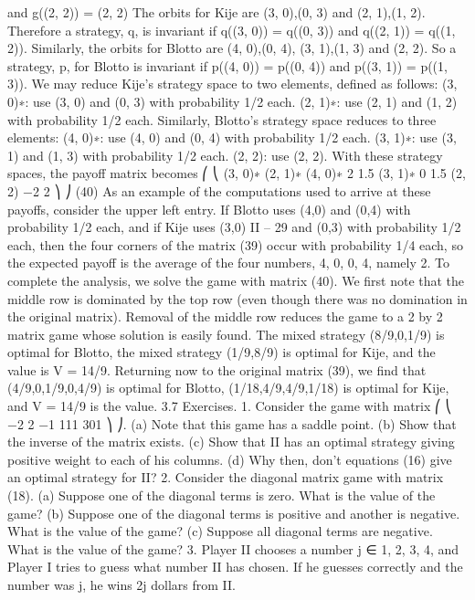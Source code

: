 and g((2, 2)) = (2, 2)
The orbits for Kije are {(3, 0),(0, 3)} and {(2, 1),(1, 2)}. Therefore a strategy, q, is
invariant if q((3, 0)) = q((0, 3)) and q((2, 1)) = q((1, 2)). Similarly, the orbits for Blotto
are {(4, 0),(0, 4)}, {(3, 1),(1, 3)} and {(2, 2)}. So a strategy, p, for Blotto is invariant if
p((4, 0)) = p((0, 4)) and p((3, 1)) = p((1, 3)).
We may reduce Kije’s strategy space to two elements, defined as follows:
(3, 0)∗: use (3, 0) and (0, 3) with probability 1/2 each.
(2, 1)∗: use (2, 1) and (1, 2) with probability 1/2 each.
Similarly, Blotto’s strategy space reduces to three elements:
(4, 0)∗: use (4, 0) and (0, 4) with probability 1/2 each.
(3, 1)∗: use (3, 1) and (1, 3) with probability 1/2 each.
(2, 2): use (2, 2).
With these strategy spaces, the payoff matrix becomes
⎛
⎝
(3, 0)∗ (2, 1)∗
(4, 0)∗ 2 1.5
(3, 1)∗ 0 1.5
(2, 2) −2 2
⎞
⎠ (40)
As an example of the computations used to arrive at these payoffs, consider the upper
left entry. If Blotto uses (4,0) and (0,4) with probability 1/2 each, and if Kije uses (3,0)
II – 29
and (0,3) with probability 1/2 each, then the four corners of the matrix (39) occur with
probability 1/4 each, so the expected payoff is the average of the four numbers, 4, 0, 0, 4,
namely 2.
To complete the analysis, we solve the game with matrix (40). We first note that
the middle row is dominated by the top row (even though there was no domination in the
original matrix). Removal of the middle row reduces the game to a 2 by 2 matrix game
whose solution is easily found. The mixed strategy (8/9,0,1/9) is optimal for Blotto, the
mixed strategy (1/9,8/9) is optimal for Kije, and the value is V = 14/9.
Returning now to the original matrix (39), we find that (4/9,0,1/9,0,4/9) is optimal
for Blotto, (1/18,4/9,4/9,1/18) is optimal for Kije, and V = 14/9 is the value.
3.7 Exercises.
1. Consider the game with matrix
⎛
⎝
−2 2 −1
111
301
⎞
⎠.
(a) Note that this game has a saddle point.
(b) Show that the inverse of the matrix exists.
(c) Show that II has an optimal strategy giving positive weight to each of his columns.
(d) Why then, don’t equations (16) give an optimal strategy for II?
2. Consider the diagonal matrix game with matrix (18).
(a) Suppose one of the diagonal terms is zero. What is the value of the game?
(b) Suppose one of the diagonal terms is positive and another is negative. What is
the value of the game?
(c) Suppose all diagonal terms are negative. What is the value of the game?
3. Player II chooses a number j ∈ {1, 2, 3, 4}, and Player I tries to guess what number
II has chosen. If he guesses correctly and the number was j, he wins 2j dollars from II.
